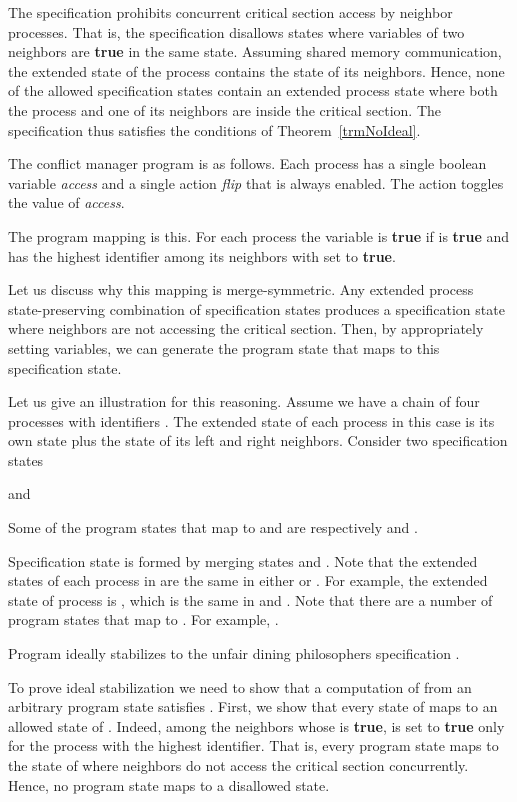 \documentclass[11pt]{llncs}
\def\Proof{\par\noindent{\bf Proof:}\indent}
\def\PROG#1{}
\begin{document}
The specification prohibits concurrent critical section access by
neighbor processes. That is, the specification disallows states where
 variables of two neighbors are \textbf{true} in the same
state. Assuming shared memory communication, the extended state of the
process contains the state of its neighbors. Hence, none of the
allowed specification states contain an extended process state where
both the process and one of its neighbors are inside the critical
section. The specification thus satisfies the conditions of
Theorem~\ref{trmNoIdeal}.

The conflict manager program \PROG{CM} is as follows. Each
process has a single boolean variable \emph{access} and a single
action \emph{flip} that is always enabled. The action toggles the
value of \emph{access}.



The program mapping is this. For each process  the variable 
is \textbf{true} if  is \textbf{true} and  has the
highest identifier among its neighbors with  set to
\textbf{true}.

Let us discuss why this mapping is merge-symmetric.  Any extended
process state-preserving combination of specification states produces
a specification state where neighbors are not accessing the critical
section. Then, by appropriately setting  variables, we can
generate the program state that maps to this specification state.

Let us give an illustration for this reasoning. Assume we have a chain
of four processes with identifiers . The
extended state of each process in this case is its own state plus the
state of its left and right neighbors.  Consider two specification
states  

and 

Some of the program states that map to  and  are
respectively 
and .

Specification state 
is formed by merging states  and . Note that the extended
states of each process in  are the same in either  or
. For example, the extended state of process  is , which is the
same in  and . Note that there are a number of program
states that map to . For example, .


\begin{theorem}\label{trmCM}
Program \PROG{CM} ideally stabilizes to the unfair dining philosophers
specification \PROG{UDP}.
\end{theorem}

\Proof To prove ideal stabilization we need to show that a computation
of \PROG{CM} from an arbitrary program state satisfies
\PROG{UDP}. First, we show that every state of \PROG{CM} maps to an
allowed state of \PROG{UDP}. Indeed, among the neighbors whose
 is \textbf{true},  is set to \textbf{true} only for the
process with the highest identifier. That is, every program state maps
to the state of \PROG{UDP} where neighbors do not access the critical
section concurrently. Hence, no program state maps to a disallowed
state. 
\end{document}
